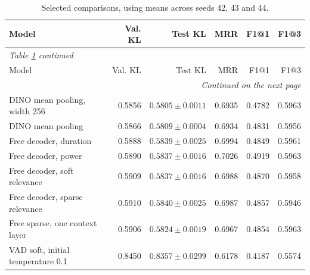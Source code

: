 \begingroup
\small
\setlength{\tabcolsep}{4pt}
\begin{longtable}{p{5.6cm}rrrrr}
\caption{Selected comparisons, using means across seeds 42, 43 and 44.}\label{tab:selected}\\
\toprule
Model & Val. KL & Test KL & MRR & F1@1 & F1@3 \\
\midrule\endfirsthead
\multicolumn{6}{l}{\textit{Table \ref{tab:selected} continued}}\\
\toprule
Model & Val. KL & Test KL & MRR & F1@1 & F1@3 \\
\midrule\endhead
\midrule\multicolumn{6}{r}{\textit{Continued on the next page}}\\\endfoot
\bottomrule\endlastfoot
DINO mean pooling, width 256 & 0.5856 & $0.5805 \pm 0.0011$ & 0.6935 & 0.4782 & 0.5963 \\
DINO mean pooling & 0.5866 & $0.5809 \pm 0.0004$ & 0.6934 & 0.4831 & 0.5956 \\
Free decoder, duration & 0.5888 & $0.5839 \pm 0.0025$ & 0.6994 & 0.4849 & 0.5961 \\
Free decoder, power & 0.5890 & $0.5837 \pm 0.0016$ & 0.7026 & 0.4919 & 0.5963 \\
Free decoder, soft relevance & 0.5909 & $0.5837 \pm 0.0016$ & 0.6988 & 0.4870 & 0.5958 \\
Free decoder, sparse relevance & 0.5910 & $0.5840 \pm 0.0025$ & 0.6987 & 0.4857 & 0.5946 \\
Free sparse, one context layer & 0.5906 & $0.5824 \pm 0.0019$ & 0.6967 & 0.4854 & 0.5963 \\
VAD soft, initial temperature 0.1 & 0.8450 & $0.8357 \pm 0.0299$ & 0.6178 & 0.4187 & 0.5574 \\
\end{longtable}
\endgroup
